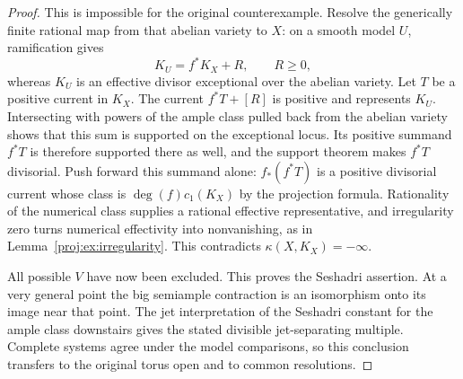 \begin{proof}
This is impossible for the original counterexample.  Resolve the
generically finite rational map from that abelian variety to \(X\):
on a smooth model \(U\), ramification gives
\[
 K_U=f^*K_X+R,\qquad R\ge0,
\]
whereas \(K_U\) is an effective divisor exceptional over the
abelian variety.  Let \(T\) be a positive current in \(K_X\).
The current \(f^*T+[R]\) is positive and represents \(K_U\).
Intersecting with powers of the ample class pulled back from the
abelian variety shows that this sum is supported on the exceptional
locus.  Its positive summand \(f^*T\) is therefore supported there
as well, and the support theorem makes \(f^*T\) divisorial.
Push forward this summand alone: \(f_*(f^*T)\) is a positive
divisorial current whose class is \(\deg(f)c_1(K_X)\) by the
projection formula.  Rationality of the numerical class supplies
a rational effective representative, and irregularity zero turns
numerical effectivity into nonvanishing, as in
Lemma~\ref{proj:ex:irregularity}.  This contradicts
\(\kappa(X,K_X)=-\infty\).

All possible \(V\) have now been excluded.  This proves the
Seshadri assertion.  At a very general point the big semiample
contraction is an isomorphism onto its image near that point.
The jet interpretation of the Seshadri constant for the ample
class downstairs gives the stated divisible jet-separating
multiple.  Complete systems agree under the model comparisons,
so this conclusion transfers to the original torus open and to
common resolutions.
\end{proof}
